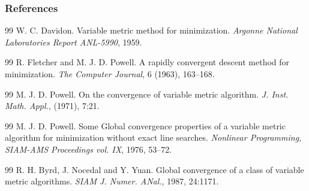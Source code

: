 \documentclass{beamer}
\begin{document}
\begin{frame}
\frametitle{References}
\footnotesize{
\begin{thebibliography}{99} %
 W. C. Davidon. 
\newblock Variable metric method for minimization.
\newblock \textit{Argonne National Laboratories Report ANL-5990}, 1959.
\end{thebibliography}

\begin{thebibliography}{99} %
 R. Fletcher and M. J. D. Powell.
\newblock    A rapidly convergent descent method for minimization.
\newblock   \textit{The Computer Journal}, 6 (1963), 163–168.
\end{thebibliography}

\begin{thebibliography}{99} %
 M. J. D. Powell.
\newblock    On the convergence of variable metric algorithm.
\newblock    \textit{J. Inst. Math. Appl.}, (1971), 7:21.
\end{thebibliography}

\begin{thebibliography}{99} %
 M. J. D. Powell.
\newblock    Some Global convergence properties of a variable metric algorithm for minimization without exact line searches.
\newblock    \textit{Nonlinear Programming, SIAM-AMS Proceedings vol. IX}, 1976, 53–72.
\end{thebibliography}

\begin{thebibliography}{99} %
 R. H. Byrd, J. Nocedal and Y. Yuan.
\newblock    Global convergence of a class of variable metric algorithms.
\newblock   \textit{SIAM J. Numer. ANal.}, 1987, 24:1171.
\end{thebibliography}
}

\end{frame}
\end{document}
